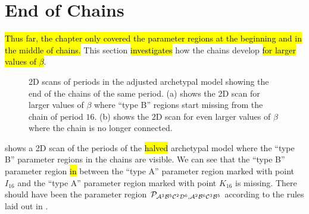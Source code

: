 \section{End of Chains}
\label{sec:arch.end}

\hl{Thus far, the chapter only covered the parameter regions at the beginning and in the middle of chains.}
This section \hl{investigates} how the chains develop \hl{for larger values of $\beta$}.

\begin{figure}
	\centering
	\caption[2D scans of periods in the archetypal model showing the end of the chains]{
		2D scans of periods in the adjusted archetypal model showing the end of the chains of the same period.
		(a) shows the 2D scan for larger values of $\beta$ where ``type B'' regions start missing from the chain of period $16$.
		(b) shows the 2D scan for even larger values of $\beta$ where the chain is no longer connected.
	}
\end{figure}

 shows a 2D scan of the periods of the \hl{halved} archetypal model where the ``type B'' parameter regions in the chains are visible.
We can see that the ``type B'' parameter region \hl{in}  between the ``type A'' parameter region marked with point $I_{16}$ and the ``type A'' parameter region marked with point $K_{16}$ is missing.
There should have been the parameter region $\mathcal{P}_{\mathcal{A}^3\mathcal{B}^5\mathcal{C}^2\mathcal{D}^6, \mathcal{A}^2\mathcal{B}^6\mathcal{C}^3\mathcal{B}^5}$ according to the rules laid out in .

